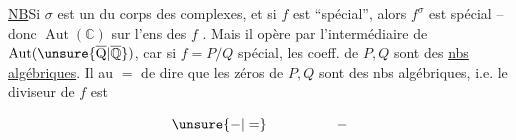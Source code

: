 \uline{NB}\quad Si $\sigma$ est un  du corps des complexes, et si $f$ est ``spécial'', alors $f^\sigma$ est  spécial -- donc $\operatorname{Aut}(\mathbb C)$  sur l'ens des $f$ . Mais il opère par l'intermédiaire de $\operatorname{Aut}(\unsure{\overline{\mathrm Q}|\overline{\mathbb Q}})$, car si $f=P/Q$ spécial, les coeff. de $P,Q$ sont des \uline{nbs algébriques}. Il  au $=$ de dire que les zéros de $P,Q$ sont des nbs algébriques, i.e. le diviseur de $f$ est

\[
 \unsure{-|=}\hspace{5em}-
\]

